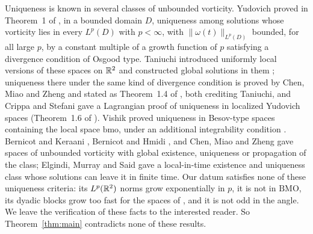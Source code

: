 Uniqueness is known in several classes of unbounded vorticity. Yudovich proved
in Theorem~1 of \cite{Yudovich1995}, in a bounded domain $D$, uniqueness among
solutions whose vorticity lies in every $L^p(D)$ with $p<\infty$, with $\|\omega(t)\|_{L^p(D)}$ bounded, for all large $p$, by a constant
multiple of a growth function of $p$ satisfying a divergence condition of Osgood
type. Taniuchi introduced uniformly local versions of these spaces on $\mathbb{R}^2$
and constructed global solutions in them \cite{Taniuchi}; uniqueness there
under the same kind of divergence condition is proved by Chen, Miao and Zheng
\cite{ChenMiaoZheng} and stated as Theorem~1.4 of \cite{CrippaStefani}, both
crediting Taniuchi, and Crippa and Stefani gave a Lagrangian proof of
uniqueness in localized Yudovich spaces (Theorem~1.6 of \cite{CrippaStefani}).
Vishik proved uniqueness in Besov-type spaces containing the local space $\mathrm{bmo}$, under an
additional integrability condition \cite{Vishik1999}. Bernicot and Keraani
\cite{BernicotKeraani}, Bernicot and Hmidi \cite{BernicotHmidi}, and Chen, Miao
and Zheng \cite{ChenMiaoZheng} gave spaces of unbounded vorticity with global
existence, uniqueness or propagation of the class; Elgindi, Murray and Said
\cite{ElgindiMurraySaid} gave a local-in-time existence and uniqueness class
whose solutions can leave it in finite time. Our datum satisfies none of these
uniqueness criteria: its $L^p(\mathbb{R}^2)$ norms grow exponentially in $p$, it is not in
$\mathrm{BMO}$, its dyadic blocks grow too fast for the spaces of
\cite{Vishik1999}, and it is not odd in the angle. We leave the verification of
these facts to the interested reader. So Theorem~\ref{thm:main} contradicts
none of these results.

